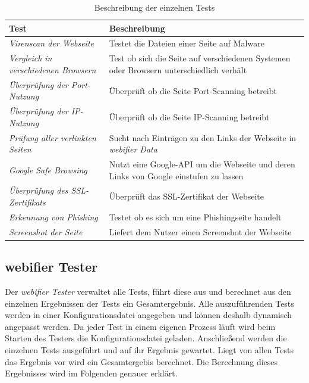 \begin{table}[H]
\centering
\begin{tabularx}{\textwidth}{|l|X|}
\hline
\textbf{Test} & \textbf{Beschreibung} \\\hline
\textit{Virenscan der Webseite} & Testet die Dateien einer Seite auf Malware \\\hline
\textit{Vergleich in verschiedenen Browsern} & Test ob sich die Seite auf verschiedenen Systemen
oder Browsern unterschiedlich verhält \\\hline 
\textit{Überprüfung der Port-Nutzung} & Überprüft ob die Seite Port-Scanning betreibt \\\hline
\textit{Überprüfung der IP-Nutzung} & Überprüft ob die Seite IP-Scanning betreibt \\\hline 
\textit{Prüfung aller verlinkten Seiten} & Sucht nach Einträgen zu den Links der Webseite
in \textit{webifier Data} \\\hline 
\textit{Google Safe Browsing} & Nutzt eine Google-API um die Webseite und deren Links von Google
einstufen zu lassen \\\hline 
\textit{Überprüfung des SSL-Zertifikats} & Überprüft das \acs{SSL}-Zertifikat der Webseite \\\hline 
\textit{Erkennung von Phishing} & Testet ob es sich um eine Phishingseite handelt \\\hline
\textit{Screenshot der Seite} & Liefert dem Nutzer einen Screenshot der Webseite \\\hline
\end{tabularx}
\caption{Beschreibung der einzelnen Tests}
\label{tbl:tests}
\end{table}

\subsection{webifier Tester}
\label{sec:konzept-tester}

Der \textit{webifier Tester} verwaltet alle Tests, führt diese aus und berechnet aus den einzelnen
Ergebnissen der Tests ein Gesamtergebnis. Alle auszuführenden Tests werden in einer
Konfigurationsdatei angegeben und können deshalb dynamisch angepasst werden. Da jeder Test in einem
eigenen Prozess läuft wird beim Starten des Testers die Konfigurationsdatei geladen. Anschließend
werden die einzelnen Tests ausgeführt und auf ihr Ergebnis gewartet. Liegt von allen Tests das
Ergebnis vor wird ein Gesamtergebis berechnet. Die Berechnung dieses Ergebnisses wird im Folgenden
genauer erklärt.

